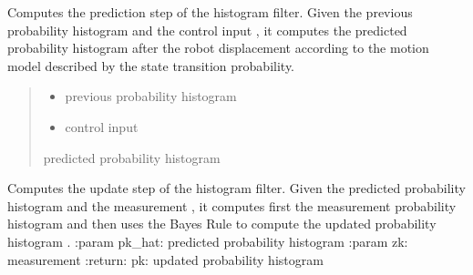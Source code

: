 \documentclass[letterpaper,10pt,english]{sphinxmanual}
\begin{document}
\begin{fulllineitems}
\begin{fulllineitems}
\label{\detokenize{HF:HF.HF.Prediction}}
\pysigstartsignatures
{}
\pysigstopsignatures
\sphinxAtStartPar
Computes the prediction step of the histogram filter. Given the previous probability histogram  and the
control input , it computes the predicted probability histogram  after the robot displacement 
according to the motion model described by the state transition probability.
\begin{quote}\begin{description}
\begin{itemize}
\item {} 
\sphinxAtStartPar
{} \textendash{} previous probability histogram

\item {} 
\sphinxAtStartPar
{} \textendash{} control input

\end{itemize}

\sphinxAtStartPar
{} predicted probability histogram

\end{description}\end{quote}

\end{fulllineitems}


\begin{fulllineitems}
\label{\detokenize{HF:HF.HF.Update}}
\pysigstartsignatures
{}
\pysigstopsignatures
\sphinxAtStartPar
Computes the update step of the histogram filter. Given the predicted probability histogram  and the measurement , it computes first the measurement probability histogram  and then uses the Bayes Rule to compute the updated probability histogram .
:param pk\_hat: predicted probability histogram
:param zk: measurement
:return: pk: updated probability histogram

\end{fulllineitems}


\end{fulllineitems}
\end{document}
